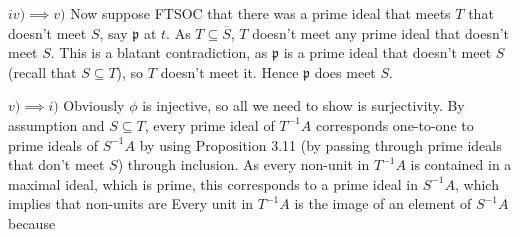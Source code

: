 \begin{questions}
\begin{solution}
	$iv) \implies v) $
	Now suppose FTSOC that there was a prime ideal that meets $T $ that doesn't meet $S $, say $\mathfrak{p} $ at $t $.
	As $T \subseteq \overline{S}  $, $T $ doesn't meet any prime ideal that doesn't meet $S $.
	This is a blatant contradiction, as $\mathfrak{p} $ is a prime ideal that doesn't meet $S $ (recall that $S \subseteq T $), so $T $ doesn't meet it.
	Hence $\mathfrak{p} $ does meet $S $.

	$v) \implies i) $ Obviously $\phi  $ is injective, so all we need to show is surjectivity.
	By assumption and $S\subseteq T $, every prime ideal of $T^{-1}A $ corresponds one-to-one to prime ideals of $S^{-1}A $ by using Proposition 3.11 (by passing through prime ideals that don't meet $S $) through inclusion.
	As every non-unit in $T^{-1}A $ is contained in a maximal ideal, which is prime, this corresponds to a prime ideal in $S^{-1}A $, which implies that non-units are 
	Every unit in $T^{-1}A $ is the image of an element of $S^{-1}A $ because 
\end{solution}


\end{questions}
